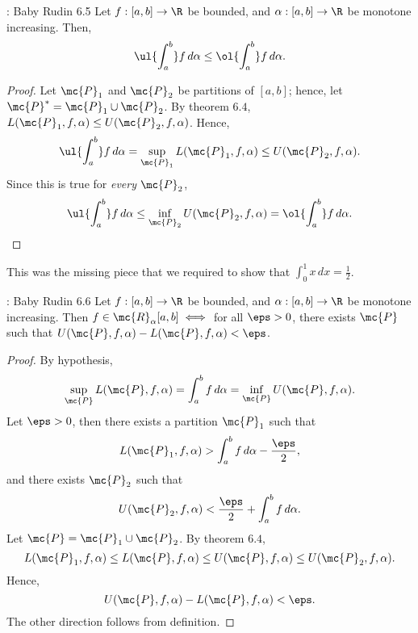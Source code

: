\begin{ntheorem}{: Baby Rudin 6.5}
	Let \(f:[a,b]\to\R\) be bounded, and \(\alpha:[a,b]\to\R\) be monotone increasing. Then,
	\begin{equation*}
		\ul{\int_a^b}f \, d\alpha\leq \ol{\int_a^b}f \, d\alpha.
	\end{equation*}
\end{ntheorem}
\begin{proof}
	Let \(\mc{P}_1\) and \(\mc{P}_2\) be partitions of \([a,b]\); hence, let \(\mc{P}^*=\mc{P}_1\cup\mc{P}_2\). By theorem \(6.4\), \(L(\mc{P}_1,f,\alpha)\leq U(\mc{P}_2,f,\alpha)\). Hence, 
	\begin{equation*}
		\ul{\int_a^b}f \, d\alpha=\sup_{\mc{P}_1}{L(\mc{P}_1,f,\alpha)}\leq U(\mc{P}_2,f,\alpha).
	\end{equation*}
	Since this is true for \emph{every} \(\mc{P}_2\),
	\begin{equation*}
		\ul{\int_a^b} f \, d\alpha \leq \inf_{\mc{P}_2} U(\mc{P}_2,f,\alpha)=\ol{\int_a^b} f \, d\alpha.
	\end{equation*} 
\end{proof}

\begin{note}
	This was the missing piece that we required to show that \(\displaystyle\int_0^1 x \, dx=\displaystyle\frac{1}{2}\).
\end{note}

\begin{ntheorem}{: Baby Rudin 6.6}
	Let \(f:[a,b]\to\R\) be bounded, and \(\alpha:[a,b]\to\R\) be monotone increasing. Then \(f\in\mc{R}_{\alpha}[a,b]\iff\) for all \(\eps>0\), there exists \(\mc{P}\) such that \(U(\mc{P},f,\alpha)-L(\mc{P},f,\alpha)<\eps\).
\end{ntheorem}
\begin{proof}
	By hypothesis, 
	\begin{equation*}
		\sup_{\mc{P}}{L(\mc{P},f,\alpha)}=\int_a^b f \, d\alpha=\inf_{\mc{P}}{U(\mc{P},f,\alpha)}.
	\end{equation*}
	Let \(\eps>0\), then there exists a partition \(\mc{P}_1\) such that 
	\begin{equation*}
		L(\mc{P}_1,f,\alpha)> \int_a^b f \, d\alpha-\frac{\eps}{2},
	\end{equation*}
	and there exists \(\mc{P}_2\) such that
	\begin{equation*}
		U(\mc{P}_2,f,\alpha)< \frac{\eps}{2}+\int_a^b f \, d\alpha.
	\end{equation*}
	Let \(\mc{P}=\mc{P}_1\cup\mc{P}_2\). By theorem \(6.4\), 
	\begin{equation*}
		L(\mc{P}_1,f,\alpha)\leq L(\mc{P},f,\alpha)\leq U(\mc{P},f,\alpha)\leq U(\mc{P}_2,f,\alpha).
	\end{equation*}
	Hence, 
	\begin{equation*}
		U(\mc{P},f,\alpha)-L(\mc{P},f,\alpha)<\eps.
	\end{equation*}
	The other direction follows from definition.
\end{proof}
